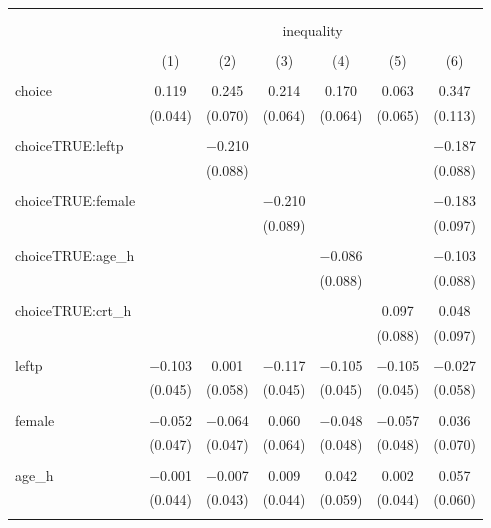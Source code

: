 
\begin{table}[!htbp] \centering 
  \caption{} 
  \label{} 
\begin{tabular}{@{\extracolsep{5pt}}lcccccc} 
\\[-1.8ex]\hline 
\hline \\[-1.8ex] 
\\[-1.8ex] & \multicolumn{6}{c}{inequality} \\ 
\\[-1.8ex] & (1) & (2) & (3) & (4) & (5) & (6)\\ 
\hline \\[-1.8ex] 
 choice & 0.119 & 0.245 & 0.214 & 0.170 & 0.063 & 0.347 \\ 
  & (0.044) & (0.070) & (0.064) & (0.064) & (0.065) & (0.113) \\ 
  & & & & & & \\ 
 choiceTRUE:leftp &  & $-$0.210 &  &  &  & $-$0.187 \\ 
  &  & (0.088) &  &  &  & (0.088) \\ 
  & & & & & & \\ 
 choiceTRUE:female &  &  & $-$0.210 &  &  & $-$0.183 \\ 
  &  &  & (0.089) &  &  & (0.097) \\ 
  & & & & & & \\ 
 choiceTRUE:age\_h &  &  &  & $-$0.086 &  & $-$0.103 \\ 
  &  &  &  & (0.088) &  & (0.088) \\ 
  & & & & & & \\ 
 choiceTRUE:crt\_h &  &  &  &  & 0.097 & 0.048 \\ 
  &  &  &  &  & (0.088) & (0.097) \\ 
  & & & & & & \\ 
 leftp & $-$0.103 & 0.001 & $-$0.117 & $-$0.105 & $-$0.105 & $-$0.027 \\ 
  & (0.045) & (0.058) & (0.045) & (0.045) & (0.045) & (0.058) \\ 
  & & & & & & \\ 
 female & $-$0.052 & $-$0.064 & 0.060 & $-$0.048 & $-$0.057 & 0.036 \\ 
  & (0.047) & (0.047) & (0.064) & (0.048) & (0.048) & (0.070) \\ 
  & & & & & & \\ 
 age\_h & $-$0.001 & $-$0.007 & 0.009 & 0.042 & 0.002 & 0.057 \\ 
  & (0.044) & (0.043) & (0.044) & (0.059) & (0.044) & (0.060) \\ 
  & & & & & & \\ 

\end{tabular}
\end{table}

